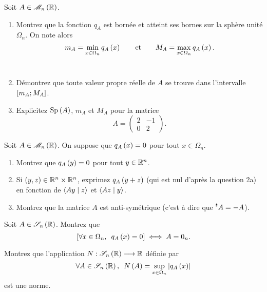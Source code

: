 \begin{q}
Soit \(A\in\M{n}[\R]\).

\begin{enumerate}
    \item Montrez que la fonction \(q_A\) est bornée et atteint ses bornes sur la sphère unité \(\Omega_n\). On note alors \[m_A=\min_{x\in\Omega_n}q_A\left(x\right)\qquad\text{et}\qquad M_A=\max_{x\in\Omega_n}q_A\left(x\right).\] \\
    \item Démontrez que toute valeur propre réelle de \(A\) se trouve dans l'intervalle \(\left[m_A;M_A\right]\). \\
    \item Explicitez \(\Sp{A}\), \(m_A\) et \(M_A\) pour la matrice \[A=\begin{pmatrix}
        2 & -1 \\
        0 & 2
    \end{pmatrix}.\]
\end{enumerate}
\end{q}

\begin{q}
Soit \(A\in\M{n}[\R]\). On suppose que \(q_A\left(x\right)=0\) pour tout \(x\in\Omega_n\).

\begin{enumerate}
    \item Montrez que \(q_A\left(y\right)=0\) pour tout \(y\in\mathbb{R}^n\). \\
    \item Si \(\left(y,z\right)\in\mathbb{R}^n\times\mathbb{R}^n\), exprimez \(q_A\left(y+z\right)\) (qui est nul d'après la question 2a) en fonction de \(\left\langle Ay\;\middle|\; z\right\rangle\) et \(\left\langle Az\;\middle|\; y\right\rangle\). \\
    \item Montrez que la matrice \(A\) est anti-symétrique (c'est à dire que \(\prescript{t}{}{A}=-A\)).
\end{enumerate}
\end{q}

\begin{q}
Soit \(A\in\sym{n}[\R]\). Montrez que \[\croch{\quantifs{\forall x\in\Omega_n}q_A\paren{x}=0}\ssi A=0_n.\]
\end{q}

\begin{q}
Montrez que l'application \(N:\sym{n}[\R]\to\R\) définie par \[\quantifs{\forall A\in\sym{n}[\R]}N\paren{A}=\sup_{x\in\Omega_n}\abs{q_A\paren{x}}\] est une norme.
\end{q}

